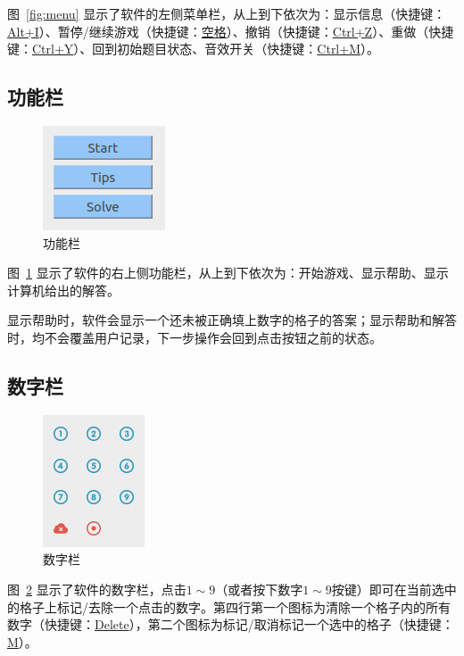 \documentclass[a4paper]{article}
\begin{document}
图~\ref{fig:menu} 显示了软件的左侧菜单栏，从上到下依次为：显示信息（快捷键：\uline{Alt+I}）、暂停/继续游戏（快捷键：\uline{空格}）、撤销（快捷键：\uline{Ctrl+Z}）、重做（快捷键：\uline{Ctrl+Y}）、回到初始题目状态、音效开关（快捷键：\uline{Ctrl+M}）。
\subsection{功能栏}
\begin{figure}[htp]
\centering
\includegraphics[width=0.3\linewidth]{function.png}
\caption{功能栏}
\label{fig:func}
\end{figure}

图~\ref{fig:func} 显示了软件的右上侧功能栏，从上到下依次为：开始游戏、显示帮助、显示计算机给出的解答。

显示帮助时，软件会显示一个还未被正确填上数字的格子的答案；显示帮助和解答时，均不会覆盖用户记录，下一步操作会回到点击按钮之前的状态。
\subsection{数字栏}
\begin{figure}[htp]
\centering
\includegraphics[width=0.2\linewidth]{number.png}
\caption{数字栏}
\label{fig:num}
\end{figure}

图~\ref{fig:num} 显示了软件的数字栏，点击$1\sim 9$（或者按下数字$1\sim 9$按键）即可在当前选中的格子上标记/去除一个点击的数字。第四行第一个图标为清除一个格子内的所有数字（快捷键：\uline{Delete}），第二个图标为标记/取消标记一个选中的格子（快捷键：\uline{M}）。
\end{document}
